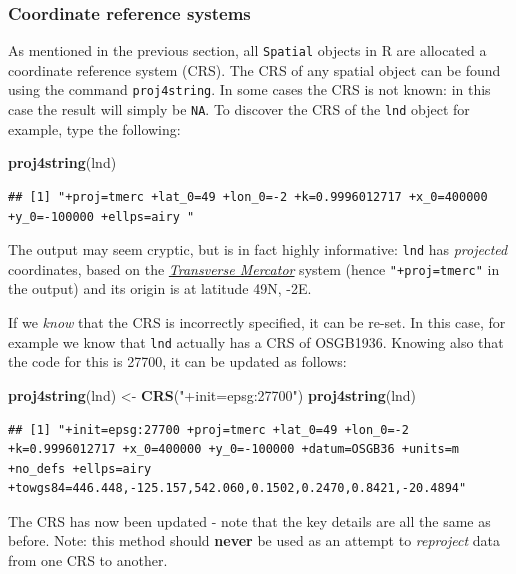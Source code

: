 \documentclass[]{article}
\newenvironment{Shaded}{}{}
\newcommand{\KeywordTok}[1]{\textcolor[rgb]{0.00,0.44,0.13}{\textbf{{#1}}}}
\newcommand{\StringTok}[1]{\textcolor[rgb]{0.25,0.44,0.63}{{#1}}}
\newcommand{\NormalTok}[1]{{#1}}
\begin{document}
\subsubsection{Coordinate reference systems}

As mentioned in the previous section, all \texttt{Spatial} objects in R
are allocated a coordinate reference system (CRS). The CRS of any
spatial object can be found using the command \texttt{proj4string}. In
some cases the CRS is not known: in this case the result will simply be
\texttt{NA}. To discover the CRS of the \texttt{lnd} object for example,
type the following:

\begin{Shaded}
\begin{Highlighting}[]
\KeywordTok{proj4string}\NormalTok{(lnd)}
\end{Highlighting}
\end{Shaded}
\begin{verbatim}
## [1] "+proj=tmerc +lat_0=49 +lon_0=-2 +k=0.9996012717 +x_0=400000 +y_0=-100000 +ellps=airy "
\end{verbatim}
The output may seem cryptic, but is in fact highly informative:
\texttt{lnd} has \emph{projected} coordinates, based on the
\href{http://en.wikipedia.org/wiki/Transverse\_Mercator\_projection}{\emph{Transverse
Mercator}} system (hence \texttt{"+proj=tmerc"} in the output) and its
origin is at latitude 49N, -2E.

If we \emph{know} that the CRS is incorrectly specified, it can be
re-set. In this case, for example we know that \texttt{lnd} actually has
a CRS of OSGB1936. Knowing also that the code for this is 27700, it can
be updated as follows:

\begin{Shaded}
\begin{Highlighting}[]
\KeywordTok{proj4string}\NormalTok{(lnd) <- }\KeywordTok{CRS}\NormalTok{(}\StringTok{"+init=epsg:27700"}\NormalTok{)}
\KeywordTok{proj4string}\NormalTok{(lnd)}
\end{Highlighting}
\end{Shaded}
\begin{verbatim}
## [1] "+init=epsg:27700 +proj=tmerc +lat_0=49 +lon_0=-2 +k=0.9996012717 +x_0=400000 +y_0=-100000 +datum=OSGB36 +units=m +no_defs +ellps=airy +towgs84=446.448,-125.157,542.060,0.1502,0.2470,0.8421,-20.4894"
\end{verbatim}
The CRS has now been updated - note that the key details are all the
same as before. Note: this method should \textbf{never} be used as an
attempt to \emph{reproject} data from one CRS to another.
\end{document}
